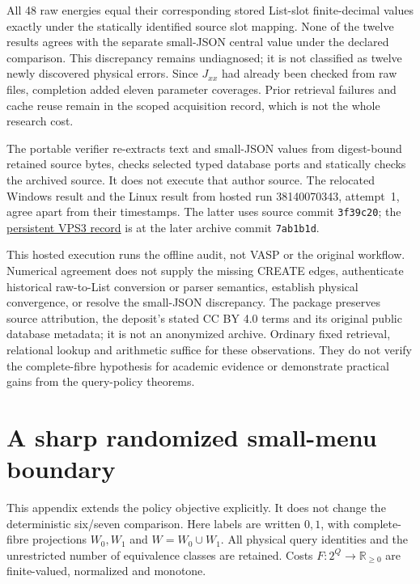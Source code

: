 \documentclass[pdflatex,sn-mathphys-num]{sn-jnl}
\theoremstyle{thmstyleone}
\theoremstyle{thmstylethree}
\theoremstyle{thmstyletwo}
\begin{document}
All 48 raw energies equal their corresponding stored List-slot finite-decimal values exactly under the statically identified source slot mapping. None of the twelve results agrees with the separate small-JSON central value under the declared comparison. This discrepancy remains undiagnosed; it is not classified as twelve newly discovered physical errors. Since $J_{xx}$ had already been checked from raw files, completion added eleven parameter coverages. Prior retrieval failures and cache reuse remain in the scoped acquisition record, which is not the whole research cost.

The portable verifier re-extracts text and small-JSON values from digest-bound retained source bytes, checks selected typed database ports and statically checks the archived source. It does not execute that author source. The relocated Windows result and the Linux result from hosted run 38140070343, attempt~1, agree apart from their timestamps. The latter uses source commit \texttt{3f39c20}; the \href{https://github.com/SHiJiE1115/newproj/blob/7ab1b1dcca85068dc8b81683162699f1a8c3d060/VPS3_HOSTED_RUNS.md}{persistent VPS3 record} is at the later archive commit \texttt{7ab1b1d}.

This hosted execution runs the offline audit, not VASP or the original workflow. Numerical agreement does not supply the missing CREATE edges, authenticate historical raw-to-List conversion or parser semantics, establish physical convergence, or resolve the small-JSON discrepancy. The package preserves source attribution, the deposit's stated CC BY 4.0 terms and its original public database metadata; it is not an anonymized archive. Ordinary fixed retrieval, relational lookup and arithmetic suffice for these observations. They do not verify the complete-fibre hypothesis for academic evidence or demonstrate practical gains from the query-policy theorems.


\section{A sharp randomized small-menu boundary}\label{app:randomized-boundary}
This appendix extends the policy objective explicitly. It does not change the deterministic six/seven comparison. Here labels are written $0,1$, with complete-fibre projections $W_0,W_1$ and $W=W_0\cup W_1$. All physical query identities and the unrestricted number of equivalence classes are retained. Costs $F:2^Q\to\mathbb R_{\geq0}$ are finite-valued, normalized and monotone.
\end{document}
